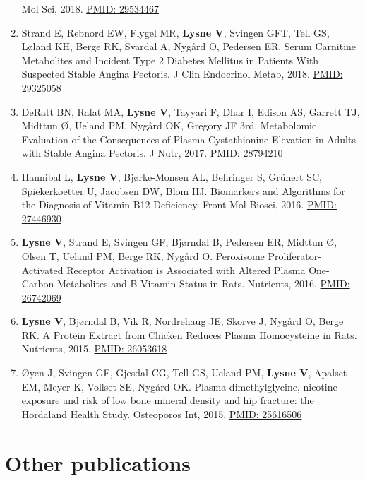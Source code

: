 \documentclass[11pt, a4paper]{awesome-cv}
\begin{document}
\begin{enumerate}
  Mol Sci, 2018.
  \href{https://www.ncbi.nlm.nih.gov/pubmed/29534467}{PMID: 29534467}
\item
  Strand E, Rebnord EW, Flygel MR, \textbf{Lysne V}, Svingen GFT, Tell
  GS, Løland KH, Berge RK, Svardal A, Nygård O, Pedersen ER. Serum
  Carnitine Metabolites and Incident Type 2 Diabetes Mellitus in
  Patients With Suspected Stable Angina Pectoris. J Clin Endocrinol
  Metab, 2018. \href{https://www.ncbi.nlm.nih.gov/pubmed/29325058}{PMID:
  29325058}
\item
  DeRatt BN, Ralat MA, \textbf{Lysne V}, Tayyari F, Dhar I, Edison AS,
  Garrett TJ, Midttun Ø, Ueland PM, Nygård OK, Gregory JF 3rd.
  Metabolomic Evaluation of the Consequences of Plasma Cystathionine
  Elevation in Adults with Stable Angina Pectoris. J Nutr, 2017.
  \href{https://www.ncbi.nlm.nih.gov/pubmed/28794210}{PMID: 28794210}
\item
  Hannibal L, \textbf{Lysne V}, Bjørke-Monsen AL, Behringer S, Grünert
  SC, Spiekerkoetter U, Jacobsen DW, Blom HJ. Biomarkers and Algorithms
  for the Diagnosis of Vitamin B12 Deficiency. Front Mol Biosci, 2016.
  \href{https://www.ncbi.nlm.nih.gov/pubmed/}{PMID: 27446930}
\item
  \textbf{Lysne V}, Strand E, Svingen GF, Bjørndal B, Pedersen ER,
  Midttun Ø, Olsen T, Ueland PM, Berge RK, Nygård O. Peroxisome
  Proliferator-Activated Receptor Activation is Associated with Altered
  Plasma One-Carbon Metabolites and B-Vitamin Status in Rats. Nutrients,
  2016. \href{https://www.ncbi.nlm.nih.gov/pubmed/26742069}{PMID:
  26742069}
\item
  \textbf{Lysne V}, Bjørndal B, Vik R, Nordrehaug JE, Skorve J, Nygård
  O, Berge RK. A Protein Extract from Chicken Reduces Plasma
  Homocysteine in Rats. Nutrients, 2015.
  \href{https://www.ncbi.nlm.nih.gov/pubmed/26053618}{PMID: 26053618}
\item
  Øyen J, Svingen GF, Gjesdal CG, Tell GS, Ueland PM, \textbf{Lysne V},
  Apalset EM, Meyer K, Vollset SE, Nygård OK. Plasma dimethylglycine,
  nicotine exposure and risk of low bone mineral density and hip
  fracture: the Hordaland Health Study. Osteoporos Int, 2015.
  \href{https://www.ncbi.nlm.nih.gov/pubmed/25616506}{PMID: 25616506}
\end{enumerate}

\hypertarget{other-publications}{%
\section{Other publications}\label{other-publications}}
\end{document}
